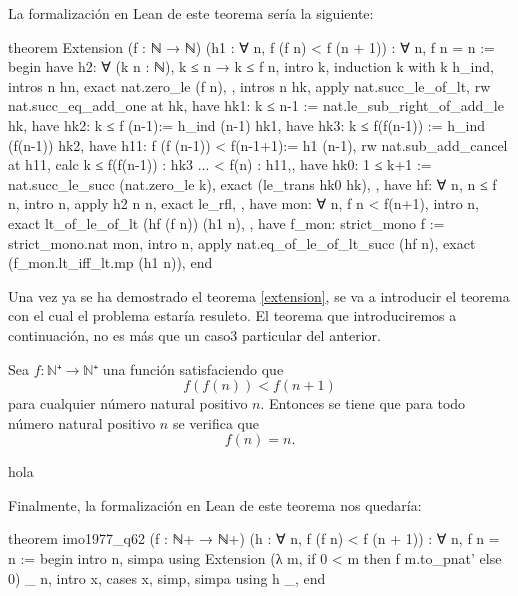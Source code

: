 La formalización en Lean de este teorema sería la siguiente:
\begin{leancode}
theorem Extension
  (f : ℕ → ℕ)
  (h1 : ∀ n, f (f n) < f (n + 1))
  : ∀ n, f n = n :=
begin
  have h2: ∀ (k n : ℕ), k ≤ n → k ≤ f n,
  { intro k,
     induction k with k h_ind,
     { intros n hn,
       exact nat.zero_le (f n), },
     { intros n hk,
       apply nat.succ_le_of_lt,
       rw nat.succ_eq_add_one at hk,
       have hk1: k ≤ n-1 := nat.le_sub_right_of_add_le hk,
       have hk2: k ≤ f (n-1):= h_ind (n-1) hk1,
       have hk3: k ≤ f(f(n-1)) := h_ind (f(n-1)) hk2,
       have h11: f (f (n-1)) < f(n-1+1):= h1 (n-1),
       rw nat.sub_add_cancel at h11,
       { calc k ≤ f(f(n-1)) : hk3
            ... < f(n)      : h11,},
       have hk0: 1 ≤ k+1 := nat.succ_le_succ (nat.zero_le k),
       exact (le_trans hk0 hk), }},
  have hf: ∀ n, n ≤ f n,
    { intro n,
      apply h2 n n,
      exact le_rfl, },
  have mon: ∀ n, f n < f(n+1),
    { intro n,
      exact lt_of_le_of_lt (hf (f n)) (h1 n), },
  have f_mon: strict_mono f := strict_mono.nat mon,
  intro n,
  apply nat.eq_of_le_of_lt_succ (hf n),
  exact (f_mon.lt_iff_lt.mp (h1 n)),
end
\end{leancode}

Una vez ya se ha demostrado el teorema \ref{extension}, se va a
introducir el teorema con el cual el problema estaría resuleto.
El teorema que introduciremos a continuación, no es más que un caso3
particular del anterior.


\begin{teorema}[imo1977\(\_ \)q62]
  Sea \(f:ℕ⁺ → ℕ⁺\) una función satisfaciendo que
  \begin{equation}
    f(f(n))<f(n+1)
  \end{equation}
  para cualquier número natural positivo \(n\). Entonces se tiene
  que para todo número natural positivo \(n\) se verifica que
  \begin{equation}
    f(n)=n.
  \end{equation}
\end{teorema}
\begin{demostracion}
hola
\end{demostracion}

Finalmente, la formalización en Lean de este teorema nos quedaría:
\begin{leancode}
theorem imo1977_q62 (f : ℕ+ → ℕ+) (h : ∀ n, f (f n) < f (n + 1)) :
  ∀ n, f n = n :=
begin
  intro n,
  simpa using Extension (λ m, if 0 < m then f m.to_pnat' else 0) _ n,
  intro x,
  cases x,
  {simp},
  {simpa using h _},
end
\end{leancode}


